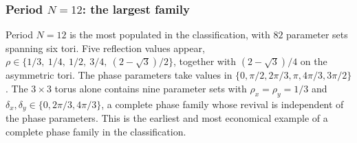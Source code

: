 \subsubsection{Period $N = 12$: the largest family}

Period $N = 12$ is the most populated in the classification, with $82$
parameter sets spanning six tori. Five reflection values appear,
$\rho \in \{1/3,\ 1/4,\ 1/2,\ 3/4,\ (2-\sqrt{3})/2\}$, together with
$(2-\sqrt{3})/4$ on the asymmetric tori. The phase parameters take
values in $\{0, \pi/2, 2\pi/3, \pi, 4\pi/3, 3\pi/2\}$. The $3 \times 3$
torus alone contains nine parameter sets with $\rho_x = \rho_y = 1/3$
and $\delta_x, \delta_y \in \{0, 2\pi/3, 4\pi/3\}$, a complete phase
family whose revival is independent of the phase parameters. This is
the earliest and most economical example of a complete phase family in
the classification.
